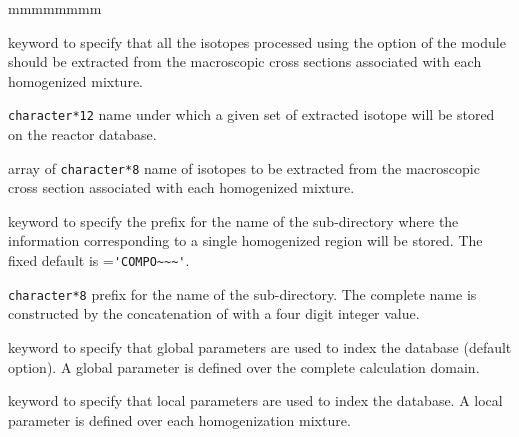 \begin{ListeDeDescription}{mmmmmmmm}
\item[\moc{ALL}] keyword to specify that all the isotopes processed using the  option of the
 module should be extracted from the macroscopic cross sections associated with each homogenized
mixture.

\item[\dusa{NEWNAME}] \verb|character*12| name under which a given set of extracted isotope will be stored
on the reactor database.

\item[\dusa{OLDNAME}] array of \verb|character*8| name of isotopes to be extracted from the macroscopic
cross section associated with each homogenized mixture.

\item[\moc{NAME}] keyword to specify the prefix for the name of the sub-directory where the information
corresponding to a single homogenized region will be stored. The fixed default is
=\verb*|'COMPO~~~'|.

\item[\dusa{NDIR}] \verb|character*8| prefix for the name of the sub-directory. The complete name is
constructed by the concatenation of  with a four digit integer value. 

\item[\moc{GLOB}] keyword to specify that global parameters are used to index the database (default option). A global parameter is
defined over the complete calculation domain.

\item[\moc{LOCA}] keyword to specify that local parameters are used to index the database. A local parameter is
defined over each homogenization mixture.

\end{ListeDeDescription}

\eject

